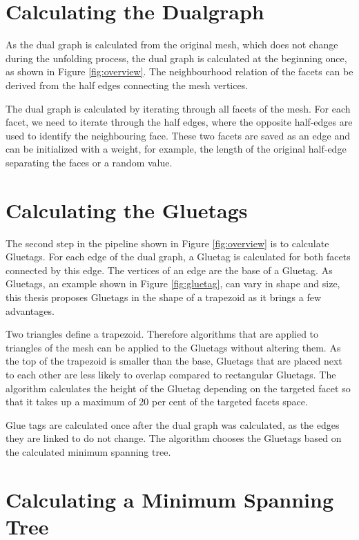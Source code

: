 \documentclass[draft,final]{vutinfth} %
\begin{document}
\section{Calculating the Dualgraph}

As the dual graph is calculated from the original mesh, which does not change during the unfolding process, the dual graph is calculated at the beginning once, as shown in Figure \ref{fig:overview}. The neighbourhood relation of the facets can be derived from the half edges connecting the mesh vertices. 

The dual graph is calculated by iterating through all facets of the mesh. For each facet, we need to iterate through the half edges, where the opposite half-edges are used to identify the neighbouring face. These two facets are saved as an edge and can be initialized with a weight, for example, the length of the original half-edge separating the faces or a random value.

\section{Calculating the Gluetags}

The second step in the pipeline shown in Figure \ref{fig:overview} is to calculate Gluetags. For each edge of the dual graph, a Gluetag is calculated for both facets connected by this edge. The vertices of an edge are the base of a Gluetag. As Gluetags, an example shown in Figure \ref{fig:gluetag}, can vary in shape and size, this thesis proposes Gluetags in the shape of a trapezoid as it brings a few advantages. 

Two triangles define a trapezoid. Therefore algorithms that are applied to triangles of the mesh can be applied to the Gluetags without altering them. As the top of the trapezoid is smaller than the base, Gluetags that are placed next to each other are less likely to overlap compared to rectangular Gluetags. The algorithm calculates the height of the Gluetag depending on the targeted facet so that it takes up a maximum of 20 per cent of the targeted facets space.

Glue tags are calculated once after the dual graph was calculated, as the edges they are linked to do not change. The algorithm chooses the Gluetags based on the calculated minimum spanning tree.

\section{Calculating a Minimum Spanning Tree}
\end{document}

